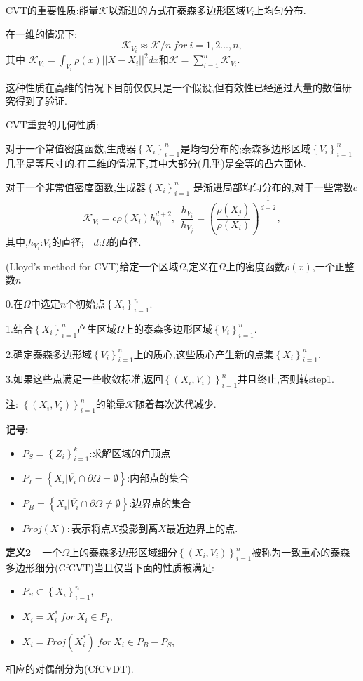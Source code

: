 \documentclass[9pt, a4paper,eqno]{article}
\theoremstyle{plain}
\begin{document}
\begin{CJK}{UTF8}{gkai}
CVT的重要性质:能量$\mathcal{K}$以渐进的方式在泰森多边形区域$V_{i}$上均匀分布.

在一维的情况下: $$\mathcal{K}_{V_i}\approx \mathcal{K}/n~for~i=1,2...,n,$$
其中 $\mathcal{K}_{V_i} = \int _{V_i} \rho(x) ||X-X_i||^2dx$和$\mathcal{K}=\sum _{i=1}^{n} \mathcal{K}_{V_{i}}.$

这种性质在高维的情况下目前仅仅只是一个假设,但有效性已经通过大量的数值研究得到了验证.

CVT重要的几何性质:

对于一个常值密度函数,生成器$\left\lbrace X_i \right\rbrace _{i=1}^{n}$是均匀分布的;泰森多边形区域$\left\lbrace V_i \right\rbrace _{i=1}^{n}$几乎是等尺寸的.在二维的情况下,其中大部分(几乎)是全等的凸六面体.

对于一个非常值密度函数,生成器$\left\lbrace X_i \right\rbrace_{i=1}^{n}$ 是渐进局部均匀分布的,对于一些常数$c$
$$\mathcal{K}_{V_i}=c \rho (X_i) h_{V_i}^{d+2},~~\dfrac{h_{V_i}}{h_{V_j}}=\left( \dfrac{\rho (X_j)}{\rho (X_i)}  \right)^{\dfrac{1}{d+2}},$$
其中,$h_{V_i}$:$V_i$的直径;~~$d$:$\Omega$的直径.
\begin{algorithm}
 \caption{(Lloyd's method for CVT)给定一个区域$\Omega$,定义在$\Omega$上的密度函数$\rho (x)$,一个正整数$n$}

0.在$\Omega$中选定$n$个初始点$\left\lbrace X_i \right\rbrace_{i=1}^{n}$.

1.结合$\left\lbrace X_i \right\rbrace_{i=1}^{n}$产生区域$\Omega$上的泰森多边形区域$\left\lbrace V_i \right\rbrace _{i=1}^{n}$.

2.确定泰森多边形域$\left\lbrace V_i \right\rbrace_{i=1}^{n}$上的质心,这些质心产生新的点集$\left\lbrace X_i \right\rbrace_{i=1}^{n}$.

3.如果这些点满足一些收敛标准,返回$\left\lbrace \left( X_i,V_i  \right)  \right\rbrace_{i=1}^{n}$并且终止,否则转step1.
\end{algorithm}
注: $\left\lbrace \left( X_i,V_i  \right) \right\rbrace _{i=1}^{n}$的能量$\mathcal{K}$随着每次迭代减少.

{\bf 记号:}
\begin{itemize}
\item $P_S = \left\lbrace  Z_i \right\rbrace_{i=1}^{k}$:求解区域的角顶点
\item $P_I=\left\lbrace X_i|\overline{V_i} \cap \partial \Omega = \emptyset  \right\rbrace$:内部点的集合
\item $P_B=\left\lbrace X_i | \overline{V_i} \cap \partial \Omega \neq  \emptyset  \right\rbrace $:边界点的集合
\item $Proj(X):$表示将点$X$投影到离$X$最近边界上的点.
\end{itemize}
{\bf 定义2~~}一个$\Omega$上的泰森多边形区域细分$\left\lbrace \left( X_i,V_i \right) \right\rbrace_{i=1}^{n}$被称为一致重心的泰森多边形细分(CfCVT)当且仅当下面的性质被满足:
\begin{itemize}
\item $P_S \subset \left\lbrace X_i \right\rbrace_{i=1}^{n},$
\item $X_i = X_{i}^{*}~for ~ X_i \in P_I,$
\item $X_i = Proj(X_{i}^{*}) ~for ~ X_i \in P_B - P_S,$
\end{itemize}
相应的对偶剖分为(CfCVDT).


\end{CJK}
\end{document}
